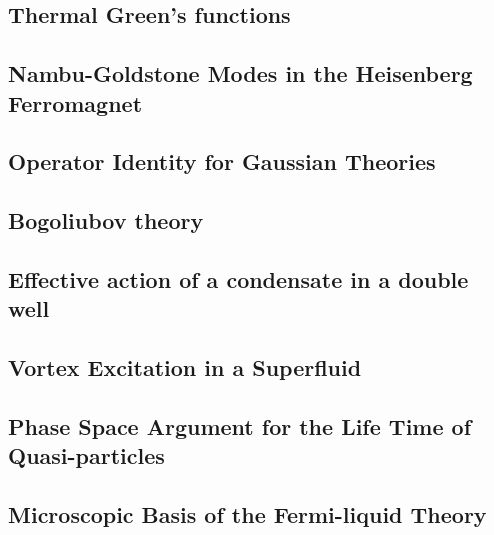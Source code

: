 \newpage
\setcounter{section}{6}
\setcounter{subsection}{0}
\subsection{Thermal Green’s functions}

\subsection{Nambu-Goldstone Modes in the Heisenberg Ferromagnet}





\newpage
\setcounter{section}{7}
\setcounter{subsection}{0}
\subsection{Operator Identity for Gaussian Theories}


\newpage
\subsection{Bogoliubov theory}








\newpage
\setcounter{section}{8}
\setcounter{subsection}{0}
\subsection{Effective action of a condensate in a double well}

\newpage
\subsection{Vortex Excitation in a Superfluid}




\newpage
\setcounter{section}{10}
\setcounter{subsection}{0}
\subsection{Phase Space Argument for the Life Time of Quasi-particles}

\subsection{Microscopic Basis of the Fermi-liquid Theory}



